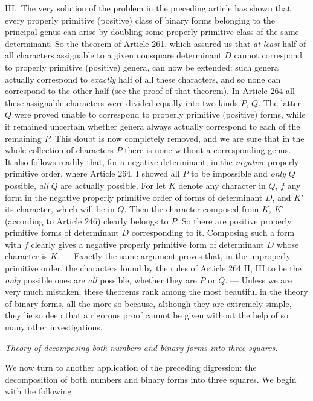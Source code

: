 III.\ The very solution of the problem in the preceding article has
shown that every properly primitive (positive) class of binary forms
belonging to the principal genus can arise by doubling some properly
primitive class of the same determinant. So the theorem of Article 261,
which assured us that \textit{at least} half of all characters
assignable to a given nonsquare determinant $D$ cannot correspond
to properly primitive (positive) genera, can now be extended: such genera
actually correspond to \textit{exactly} half of all these characters,
and so none can correspond to the other half (see the proof of that
theorem). In Article 264 all these assignable characters were divided
equally into two kinds $P$, $Q$. The latter $Q$ were proved
unable to correspond to properly primitive (positive) forms, while it
remained uncertain whether genera always actually correspond to each
of the remaining $P$. This doubt is now completely removed, and
we are sure that in the whole collection of characters $P$ there
is none without a corresponding genus. --- It also follows readily
that, for a negative determinant, in the \textit{negative} properly
primitive order, where Article 264, I showed all $P$ to be impossible
and \textit{only} $Q$ possible, \textit{all} $Q$ are actually
possible. For let $K$ denote any character in $Q$, $f$ any
form in the negative properly primitive order of forms of determinant
$D$, and $K'$ its character, which will be in $Q$. Then the
character composed from $K$, $K'$ (according to Article 246)
clearly belongs to $P$. So there are positive properly primitive
forms of determinant $D$ corresponding to it. Composing such a form
with $f$ clearly gives a negative properly primitive form of determinant
$D$ whose character is $K$. --- Exactly the same argument proves
that, in the improperly primitive order, the characters found by the
rules of Article 264 II, III to be the \textit{only} possible ones are
\textit{all} possible, whether they are $P$ or $Q$. --- Unless
we are very much mistaken, these theorems rank among the most beautiful
in the theory of binary forms, all the more so because, although they
are extremely simple, they lie so deep that a rigorous proof cannot be
given without the help of so many other investigations.

\begin{center}
\textit{Theory of decomposing both numbers and binary forms into three squares.}
\end{center}
We now turn to another application of the preceding digression: the
decomposition of both numbers and binary forms into three squares.
We begin with the following


